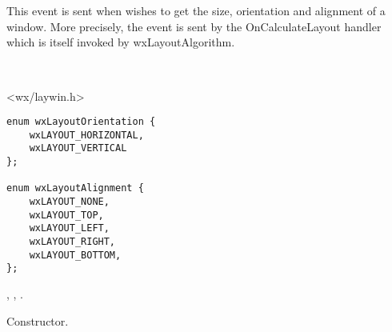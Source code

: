 \section{}\label{wxquerylayoutinfoevent}

This event is sent when  wishes to get
the size, orientation and alignment of a window. More precisely, the event is sent
by the OnCalculateLayout handler which is itself invoked by wxLayoutAlgorithm.


\\


<wx/laywin.h>


\twocolwidtha{7cm}%
\begin{twocollist}\itemsep=0pt
\end{twocollist}


{\small
\begin{verbatim}
enum wxLayoutOrientation {
    wxLAYOUT_HORIZONTAL,
    wxLAYOUT_VERTICAL
};

enum wxLayoutAlignment {
    wxLAYOUT_NONE,
    wxLAYOUT_TOP,
    wxLAYOUT_LEFT,
    wxLAYOUT_RIGHT,
    wxLAYOUT_BOTTOM,
};
\end{verbatim}
}


,\rtfsp
{},\rtfsp
{}.


\label{wxquerylayoutinfoeventctor}


Constructor.

\label{wxquerylayoutinfoeventgetalignment}



